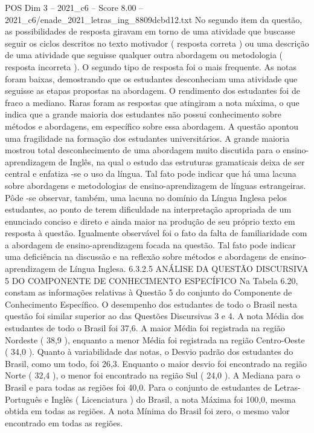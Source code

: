 \begin{textsample}{POS Dim 3 – 2021\_c6 – Score 8.00 – 2021\_c6/enade\_2021\_letras\_ing\_8809dcbd12.txt}
No segundo item da questão, as possibilidades de resposta giravam em torno de uma atividade que buscasse seguir os ciclos descritos no texto motivador ( resposta correta ) ou uma descrição de uma atividade que seguisse qualquer outra abordagem ou metodologia ( resposta incorreta ).
O segundo tipo de resposta foi o mais frequente.
As notas foram baixas, demostrando que os estudantes desconheciam uma atividade que seguisse as etapas propostas na abordagem.
O rendimento dos estudantes foi de fraco a mediano.
Raras foram as respostas que atingiram a nota máxima, o que indica que a grande maioria dos estudantes não possui conhecimento sobre métodos e abordagens, em específico sobre essa abordagem.
A questão apontou uma fragilidade na formação dos estudantes universitários.
A grande maioria mostrou total desconhecimento de uma abordagem muito discutida para o ensino-aprendizagem de Inglês, na qual o estudo das estruturas gramaticais deixa de ser central e enfatiza -se o uso da língua.
Tal fato pode indicar que há uma lacuna sobre abordagens e metodologias de ensino-aprendizagem de línguas estrangeiras.
Pôde -se observar, também, uma lacuna no domínio da Língua Inglesa pelos estudantes, ao ponto de terem dificuldade na interpretação apropriada de um enunciado conciso e direto e ainda maior na produção de seu próprio texto em resposta à questão.
Igualmente observável foi o fato da falta de familiaridade com a abordagem de ensino-aprendizagem focada na questão.
Tal fato pode indicar uma deficiência na discussão e na reflexão sobre métodos e abordagens de ensino-aprendizagem de Língua Inglesa. 6.3.2.5 ANÁLISE DA QUESTÃO DISCURSIVA 5 DO COMPONENTE DE CONHECIMENTO ESPECÍFICO Na Tabela 6.20, constam as informações relativas à Questão 5 do conjunto do Componente de Conhecimento Específico.
O desempenho dos estudantes de todo o Brasil nesta questão foi similar superior ao das Questões Discursivas 3 e 4.
A nota Média dos estudantes de todo o Brasil foi 37,6.
A maior Média foi registrada na região Nordeste ( 38,9 ), enquanto a menor Média foi registrada na região Centro-Oeste ( 34,0 ).
Quanto à variabilidade das notas, o Desvio padrão dos estudantes do Brasil, como um todo, foi 26,3.
Enquanto o maior desvio foi encontrado na região Norte ( 32,4 ), o menor foi encontrado na região Sul ( 24,0 ).
A Mediana para o Brasil e para todas as regiões foi 40,0.
Para o conjunto de estudantes de Letras-Português e Inglês ( Licenciatura ) do Brasil, a nota Máxima foi 100,0, mesma obtida em todas as regiões.
A nota Mínima do Brasil foi zero, o mesmo valor encontrado em todas as regiões.

\end{textsample}
